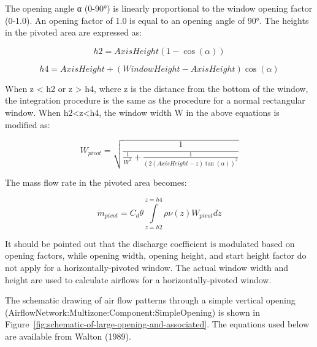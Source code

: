 The opening angle α (0-90°) is linearly proportional to the window opening factor (0-1.0). An opening factor of 1.0 is equal to an opening angle of 90°. The heights in the pivoted area are expressed as:

\begin{equation}
h2 = AxisHeight(1 - \cos (\alpha ))
\end{equation}

\begin{equation}
h4 = AxisHeight + (WindowHeight - AxisHeight)\cos (\alpha )
\end{equation}

When z \textless{} h2 or z \textgreater{} h4, where z is the distance from the bottom of the window, the integration procedure is the same as the procedure for a normal rectangular window. When h2\textless{}z\textless{}h4, the window width W in the above equations is modified as:

\begin{equation}
W_{pivot} = \sqrt{\frac{1}{{\frac{1}{{{W^2}}} + \frac{1}{{{{(2(AxisHeight - z)\tan (\alpha ))}^2}}}}}}
\end{equation}

The mass flow rate in the pivoted area becomes:

\begin{equation}
{\dot m_{pivot}} = {C_d}\theta \int\limits_{z = h2}^{z = h4} {\rho \nu (z){W_{pivot}}dz}
\end{equation}

It should be pointed out that the discharge coefficient is modulated based on opening factors, while opening width, opening height, and start height factor do not apply for a horizontally-pivoted window. The actual window width and height are used to calculate airflows for a horizontally-pivoted window.

The schematic drawing of air flow patterns through a simple vertical opening (AirflowNetwork:Multizone:Component:SimpleOpening) is shown in Figure~\ref{fig:schematic-of-large-opening-and-associated}. The equations used below are available from Walton (1989).

